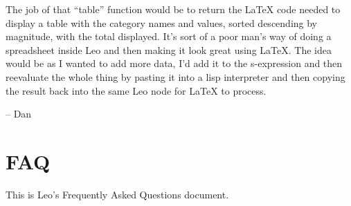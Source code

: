 \documentclass[a4paper,10pt,english]{sphinxmanual}
\begin{document}
The job of that ``table'' function would be to return the LaTeX code needed to
display a table with the category names and values, sorted descending by
magnitude, with the total displayed. It's sort of a poor man's way of doing a
spreadsheet inside Leo and then making it look great using LaTeX. The idea would
be as I wanted to add more data, I'd add it to the s-expression and then
reevaluate the whole thing by pasting it into a lisp interpreter and then
copying the result back into the same Leo node for LaTeX to process.

-- Dan


\chapter{FAQ}
\label{FAQ:faq}\label{FAQ::doc}
This is Leo's Frequently Asked Questions document.
\end{document}
